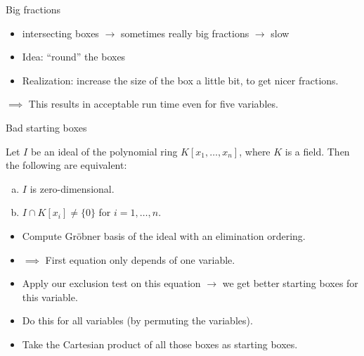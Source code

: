 \documentclass[german,10pt,xcolor=colortbl,compress, handout]{beamer}
\begin{document}
\begin{frame}{Big fractions}
    \begin{itemize}
        \item intersecting boxes $\rightarrow$ sometimes really big fractions $\rightarrow$ slow
        \item Idea: \enquote{round} the boxes
        \item Realization: increase the size of the box a little bit, to get nicer fractions.
    \end{itemize}
    \bigskip
    \pause

    \begin{center}
    \end{center}
    \pause

    $\implies$ This results in acceptable run time even for five variables.
\end{frame}

\begin{frame}{Bad starting boxes}
    \begin{lemma}
        Let $I$ be an ideal of the polynomial ring $K[x_1, \hdots, x_n]$, where $K$ is a
        field. Then the following are equivalent:
        \begin{enumerate}[a)]
            \item $I$ is zero-dimensional.
            \item $I \cap K[x_i] \neq \{0\}$ for $i=1,\hdots, n$.
        \end{enumerate}
    \end{lemma}
    \pause
    
    \begin{itemize}
        \item Compute Gröbner basis of the ideal with an elimination ordering.
        \item[] $\implies$ First equation only depends of one variable.
        \pause
        \item Apply our exclusion test on this equation $\rightarrow$ we get better
            starting boxes for this variable.
        \item Do this for all variables (by permuting the variables).
        \item Take the Cartesian product of all those boxes as starting boxes.
    \end{itemize}
\end{frame}
\end{document}
